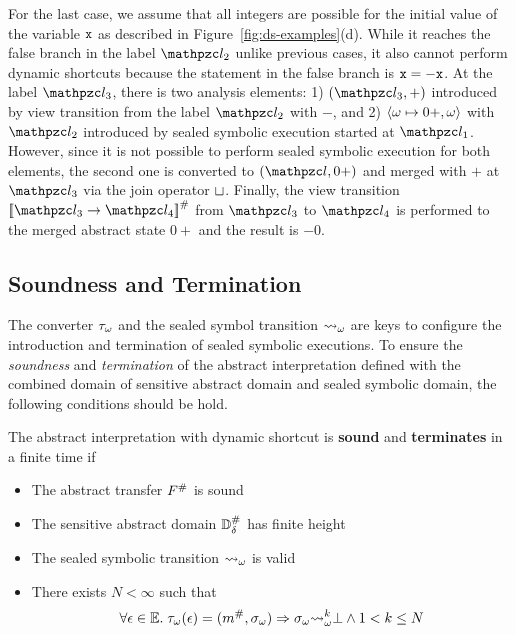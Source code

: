 For the last case, we assume that all integers are possible for the initial
value of the variable $\texttt{x}$ as described in Figure~\ref{fig:ds-examples}(d).
While it reaches the false branch in the label $\lab_2$ unlike previous cases,
it also cannot perform dynamic shortcuts because the statement in the false
branch is $\texttt{x} = -\texttt{x}$.  At the label $\lab_3$, there is two analysis
elements: 1) $(\lab_3, +)$ introduced by view transition from the label $\lab_2$
with $-$, and 2) $\langle \omega \mapsto 0+, \omega \rangle$ with $\lab_2$
introduced by sealed symbolic execution started at $\lab_1$.  However, since it
is not possible to perform sealed symbolic execution for both elements, the
second one is converted to $(\lab, 0+)$ and merged with $+$ at $\lab_3$ via the
join operator $\sqcup$.  Finally, the view transition
$\viewtrans{\lab_3}{\lab_4}$ from $\lab_3$ to $\lab_4$ is performed to the
merged abstract state $0+$ and the result is $-0$.

\subsection{Soundness and Termination}

The converter ${\tau}_\omega$ and the sealed symbol transition ${\leadsto}_\omega$ are
keys to configure the introduction and termination of sealed symbolic
executions.  To ensure the \textit{soundness} and \textit{termination} of the
abstract interpretation defined with the combined domain of sensitive abstract
domain and sealed symbolic domain, the following conditions should be hold.

\begin{theorem}\label{theorem:shortcut}
  The abstract interpretation with dynamic shortcut is \textbf{sound} and
  \textbf{terminates} in a finite time if
  \begin{itemize}
    \item The abstract transfer ${F}^{\#}$ is sound
    \item The sensitive abstract domain ${\mathbb{D}}^{\#}_\delta$ has finite height
    \item The sealed symbolic transition ${\leadsto}_\omega$ is valid
    \item There exists $N < \infty$ such that
      \[
        \forall \epsilon \in \mathbb{E}. \; {\tau}_\omega(\epsilon) = ({m}^{\#},
        {\sigma}_\omega) \Rightarrow {\sigma}_\omega
        {\leadsto}_\omega^k \bot \wedge 1 < k \leq N
      \]
  \end{itemize}
\end{theorem}

